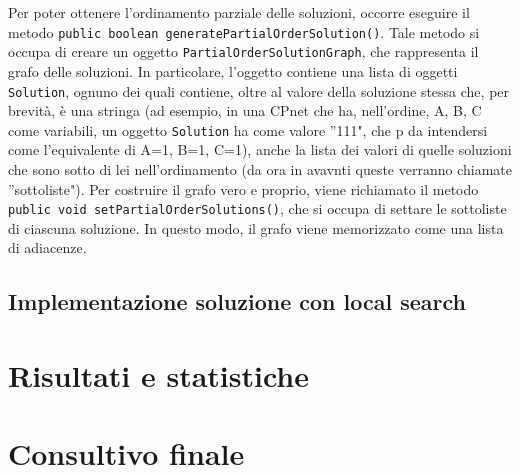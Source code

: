 \documentclass[a4paper,titlepage]{article}
\begin{document}
Per poter ottenere l'ordinamento parziale delle soluzioni, occorre eseguire il metodo \texttt{public boolean generatePartialOrderSolution()}.
Tale metodo si occupa di creare un oggetto \texttt{PartialOrderSolutionGraph}, che rappresenta il grafo delle soluzioni. In particolare,  l'oggetto contiene una lista di oggetti \texttt{Solution}, ognuno dei quali contiene, oltre al valore della soluzione stessa che, per brevità, è una stringa (ad esempio, in una CPnet che ha, nell'ordine, A, B, C come variabili, un oggetto \texttt{Solution} ha come valore ''111", che p da intendersi come l'equivalente di {A=1, B=1, C=1}), anche la lista dei valori di quelle soluzioni che sono sotto di lei nell'ordinamento (da ora in avavnti queste verranno chiamate ''sottoliste").
Per costruire il grafo vero e proprio, viene richiamato il metodo \texttt{public void setPartialOrderSolutions()}, che si occupa di settare le sottoliste di ciascuna soluzione. In questo modo, il grafo viene memorizzato come una lista di adiacenze.
\subsection{Implementazione soluzione con local search}

\section{Risultati e statistiche}

\section{Consultivo finale}
\end{document}
